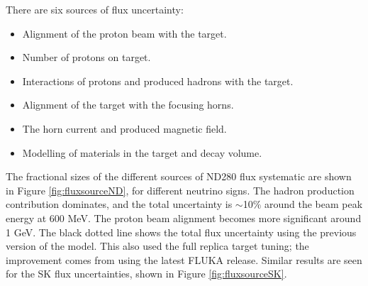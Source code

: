 There are six sources of flux uncertainty:

\begin{itemize}

\item Alignment of the proton beam with the target.

\item Number of protons on target.

\item Interactions of protons and produced hadrons with the target.

\item Alignment of the target with the focusing horns.

\item The horn current and produced magnetic field.

\item Modelling of materials in the target and decay volume.

\end{itemize}

The fractional sizes of the different sources of ND280 flux systematic are shown in Figure \ref{fig:fluxsourceND}, for different neutrino signs. The hadron production contribution dominates, and the total uncertainty is $\sim$10$\%$ around the beam peak energy at 600 MeV. The proton beam alignment becomes more significant around 1 GeV. The black dotted line shows the total flux uncertainty using the previous version of the model. This also used the full replica target tuning; the improvement comes from using the latest FLUKA\cite{fluka} release. Similar results are seen for the SK flux uncertainties, shown in Figure \ref{fig:fluxsourceSK}.

